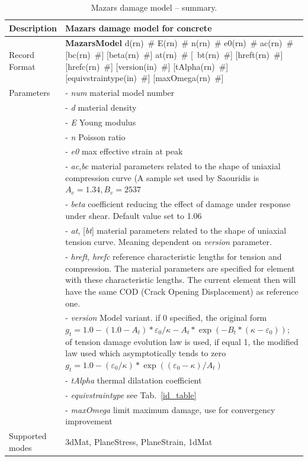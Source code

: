 \documentclass[a4paper]{article}
\newcommand{\descitem}[1]{{\noindent \bf #1}}
\newcommand{\elemparam}[2]{{{#1\tiny (#2)}~\#}}
\newcommand{\optelemparam}[2]{[{~\elemparam{#1}{#2}}]}
\newcommand{\param}[1]{{\it #1}}
\newcommand{\optparam}[1]{[{\it #1}]}
\begin{document}
\begin{table}[!htb]
\begin{tabular}{|l|p{9cm}|}
\hline
Description & Mazars damage model for concrete\\
\hline
Record Format & \descitem{MazarsModel} \elemparam{d}{rn} \elemparam{E}{rn}
\elemparam{n}{rn}  \elemparam{e0}{rn}
\elemparam{ac}{rn} [\elemparam{bc}{rn}] [\elemparam{beta}{rn}]
\elemparam{at}{rn} \optelemparam{bt}{rn}
[\elemparam{hreft}{rn}] [\elemparam{hrefc}{rn}]
[\elemparam{version}{in}] [\elemparam{tAlpha}{rn}] [\elemparam{equivstraintype}{in}]
[\elemparam{maxOmega}{rn}]\\
Parameters &- \param{num} material model number\\
&- \param{d} material density\\
&- \param{E} Young modulus\\
&- \param{n} Poisson ratio\\
&- \param{e0} max effective strain at peak\\
&- \param{ac},\param{bc} material parameters related to the shape of
uniaxial compression curve (A sample set used by Saouridis is $A_c =
1.34, B_c = 2537$\\
&- \param{beta} coefficient reducing the effect of damage under
response under shear. Default value set to 1.06\\
&- \param{at}, \optparam{bt} material parameters related to the shape of
uniaxial tension curve. Meaning dependent on \param{version}
parameter.\\
&- \param{hreft}, \param{hrefc} reference characteristic lengths for
tension and compression. The material parameters are specified for
element with these characteristic lengths. The current element then
will have the same COD (Crack Opening Displacement) as reference one.\\
&- \param{version} Model variant. if 0 specified, the original form
$g_t= 1.0-(1.0-A_t)*\varepsilon_0/\kappa - A_t*\exp(-B_t*(\kappa-\varepsilon_0));
$ of
tension damage evolution law is used, if equal 1, the modified law
used which asymptotically tends to zero
$g_t = 1.0-(\varepsilon_0/\kappa)*\exp((\varepsilon_0-\kappa)/A_t)$\\
&- \param{tAlpha} thermal dilatation coefficient\\
&- \param{equivstraintype} see Tab.~\ref{id_table}\\
&- \param{maxOmega} limit maximum damage, use for convergency improvement\\
Supported modes& 3dMat, PlaneStress, PlaneStrain, 1dMat\\
\hline
\end{tabular}
\caption{Mazars damage model  -- summary.}
\label{maz_table}
\end{table}
\end{document}

